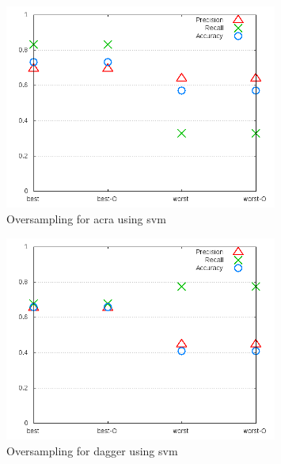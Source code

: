 \begin{figure}[!t]
    \centering

        \includegraphics[width=0.8\textwidth]{images/svm/test_4/acra_sample_range}
        \caption{Oversampling for acra using \gls{svm}}
        \label{fig:test_4_acra_svm}
\end{figure}

\begin{figure}[!ht]
    \centering
        \includegraphics[width=0.8\textwidth]{images/svm/test_4/dagger_sample_range}
        \caption{Oversampling for dagger using \gls{svm}}
        \label{fig:test_4_dagger_svm}
\end{figure}



